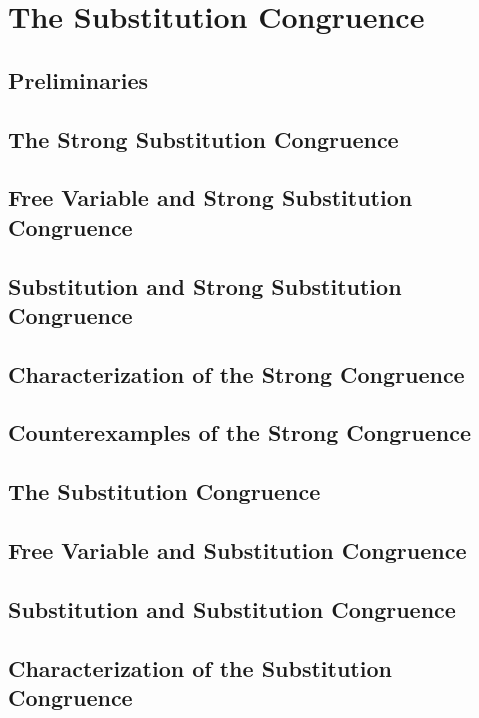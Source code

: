 \section{The Substitution Congruence}
    \subsection{Preliminaries}
      
    \subsection{The Strong Substitution Congruence}
      
    \subsection{Free Variable and Strong Substitution Congruence}
      
    \subsection{Substitution and Strong Substitution Congruence}
      
    \subsection{Characterization of the Strong Congruence}
      
    \subsection{Counterexamples of the Strong Congruence}
      
    \subsection{The Substitution Congruence}
      
    \subsection{Free Variable and Substitution Congruence}
      
    \subsection{Substitution and Substitution Congruence}
      
    \subsection{Characterization of the Substitution Congruence}
      
